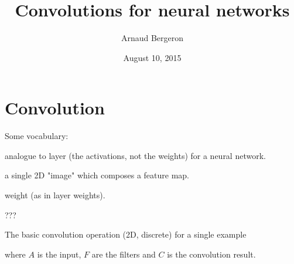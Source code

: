 \documentclass[utf8x,hyperref={pdfpagelabels=false}]{beamer}
\title{Convolutions for neural networks}
\author{%
Arnaud Bergeron
}
\date{August 10, 2015}
\begin{document}
\begin{frame}[plain]
 \titlepage
\end{frame}

\setcounter{page}{1}

\section{Convolution}

\begin{frame}
Some vocabulary:
\begin{description}
\item[feature map] analogue to layer (the activations, not the weights) for a neural network.
\item[channel] a single 2D "image" which composes a feature map.
\item[filter] weight (as in layer weights).
\item[stack] ???
\end{description}
\end{frame}

\begin{frame}
The basic convolution operation (2D, discrete) for a single example
\begin{overlayarea}{\textwidth}{5.6cm}
\end{overlayarea}
where $A$ is the input, $F$ are the filters and $C$ is the convolution result.
\end{frame}
\end{document}
